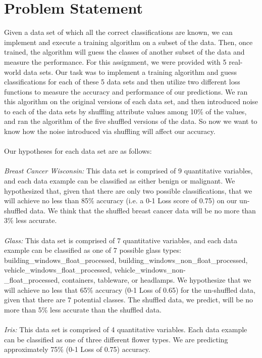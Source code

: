 \documentclass[twoside,11pt]{article}
\begin{document}
\section{Problem Statement}
Given a data set of which all the correct classifications are known, we can implement and execute a training algorithm on a subset of the data. Then, once trained, the algorithm will guess the classes of another subset of the data and measure the performance. For this assignment, we were provided with 5 real-world data sets. Our task was to implement a training algorithm and guess classifications for each of these 5 data sets and then utilize two different loss functions to measure the accuracy and performance of our predictions. We ran this algorithm on the original versions of each data set, and then introduced noise to each of the data sets by shuffling attribute values among 10\% of the values, and ran the algorithm of the five shuffled versions of the data. So now we want to know how the noise introduced via shuffling will affect our accuracy. \\ \\
Our hypotheses for each data set are as follows: \\ \\
\textit{Breast Cancer Wisconsin:} This data set is comprised of 9 quantitative variables, and each data example can be classified as either benign or malignant. We hypothesized that, given that there are only two possible classifications, that we will achieve no less than 85\% accuracy (i.e. a 0-1 Loss score of 0.75) on our un-shuffled data. We think that the shuffled breast cancer data will be no more than 3\% less accurate. \\ \\
\textit{Glass:} This data set is comprised of 7 quantitative variables, and each data example can be classified as one of 7 possible glass types: building\_windows\_float\_processed, building\_windows\_non\_float\_processed, vehicle\_windows\_float\_processed, vehicle\_windows\_non- \\ \_float\_processed, containers, tableware, or headlamps. We hypothesize that we will achieve no less that 65\% accuracy (0-1 Loss of 0.65) for the un-shuffled data, given that there are 7 potential classes. The shuffled data, we predict, will be no more than 5\% less accurate than the shuffled data.\\ \\
\textit{Iris:} This data set is comprised of 4 quantitative variables. Each data example can be classified as one of three different flower types. We are predicting approximately 75\% (0-1 Loss of 0.75) accuracy. \\ \\
\end{document}
